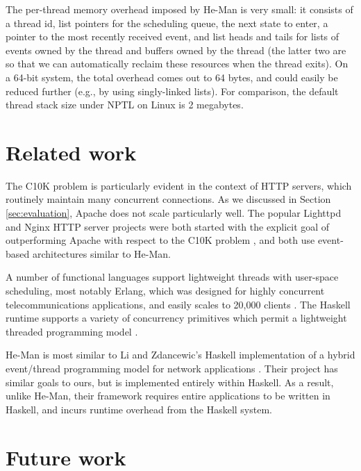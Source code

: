 \documentclass[preprint]{sigplanconf}
\begin{document}
The per-thread memory overhead imposed by He-Man is very small: it
consists of a thread id, list pointers for the scheduling queue, the
next state to enter, a pointer to the most recently received event,
and list heads and tails for lists of events owned by the thread and
buffers owned by the thread (the latter two are so that we can
automatically reclaim these resources when the thread exits). On a
64-bit system, the total overhead comes out to 64 bytes, and could
easily be reduced further (e.g., by using singly-linked lists).  For
comparison, the default thread stack size under NPTL on Linux is 2
megabytes.


\section{Related work}

The C10K problem is particularly evident in the context of HTTP
servers, which routinely maintain many concurrent connections. As we
discussed in Section \ref{sec:evaluation}, Apache does not scale
particularly well. The popular Lighttpd and Nginx HTTP server projects
were both started with the explicit goal of outperforming Apache with
respect to the C10K problem \cite{Lighttpd,Nginx}, and both use
event-based architectures similar to He-Man.

A number of functional languages support lightweight threads with
user-space scheduling, most notably Erlang, which was designed for
highly concurrent telecommunications applications, and easily scales
to 20,000 clients \cite{Hellstrom}. The Haskell runtime supports a
variety of concurrency primitives which permit a lightweight threaded
programming model \cite{LiEtAl}.


He-Man is most similar to Li and Zdancewic's Haskell implementation of
a hybrid event/thread programming model for network applications
\cite{LiZdancewic}.  Their project has similar goals to ours, but is
implemented entirely within Haskell. As a result, unlike He-Man, their
framework requires entire applications to be written in Haskell, and
incurs runtime overhead from the Haskell system.


\section{Future work}
\end{document}
